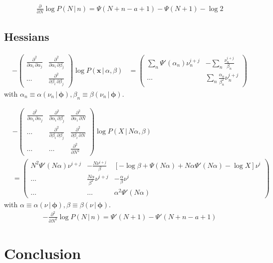 \documentclass[11pt]{article}
\newcommand{\cond}{\,|\,}
\newcommand{\bmx}{{{\bm{x}}}}
\newcommand{\bmphi}{{\bm{\phi}}}
\newcommand{\firstDeriv}[1]{\frac{\partial}{\partial #1}}
\newcommand{\secDeriv}[1]{\frac{\partial^2}{\partial #1^2}} %
\newcommand{\secPartial}[2]{\frac{\partial^2}{\partial #1 \, \partial #2}} %
\begin{document}
\begin{align}
  \label{eq:grad-nb}
  \firstDeriv{N} \log P(N \cond n) = \Psi(N+n-a+1) - \Psi(N+1) - \log 2
\end{align}

\subsection{Hessians} \label{sec:hessians}

\begin{align}
  \label{eq:hess-posterior}
    - \left(
    \begin{array}{ccc}
      \secPartial{\alpha_i}{\alpha_j} & \secPartial{\alpha_i}{\beta_j}\\
      \dots & \secPartial{\beta_i}{\beta_j}
    \end{array}
  \right) \log P(\bmx \cond \alpha, \beta)
    &= \left(
    \begin{array}{cc}
      \sum_n \Psi'(\alpha_n) \nu_n^{i+j} & -\sum_n \frac{\nu_n^{i+j}}{\beta_n}\\
      \dots & \sum_n \frac{\alpha_n}{\beta_n^2} \nu_n^{i+j}
    \end{array}
  \right)
\end{align}
with $\alpha_n \equiv \alpha(\nu_n \cond \bmphi), \beta_n \equiv \beta(\nu_n \cond \bmphi)$.

\begin{align}
  \label{eq:hess-prediction}
  & - \left(
    \begin{array}{ccc}
      \secPartial{\alpha_i}{\alpha_j} & \secPartial{\alpha_i}{\beta_j} & \secPartial{\alpha_i}{N}\\
      \dots & \secPartial{\beta_i}{\beta_j} & \secPartial{\beta_i}{N}\\
      \dots & \dots & \secDeriv{N}
    \end{array}
  \right) \log P(X \cond N \alpha, \beta)
  \\
  &=
  \left(
    \begin{array}{ccc}
      N^2 \Psi'(N \alpha) \nu^{i+j} & -\frac{N \nu^{i+j}}{\beta} & \left[ -\log \beta +\Psi(N \alpha) + N \alpha \Psi'(N \alpha) - \log X \right] \nu^{i}\\
      \dots &  \frac{N\alpha}{\beta^2} \nu^{i+j} & -\frac{\alpha}{\beta} \nu^{i} \\
      \dots & \dots & \alpha^2 \Psi'(N \alpha)
    \end{array}
  \right)
\end{align}
with $\alpha \equiv \alpha(\nu \cond \bmphi), \beta \equiv \beta(\nu \cond \bmphi)$.
\begin{align}
  \label{eq:hess-nb}
   - \secDeriv{N} \log P(N \cond n) = \Psi'(N+1) - \Psi'(N+n-a+1)
\end{align}

\section{Conclusion} \label{sec:conclusion}
\end{document}
